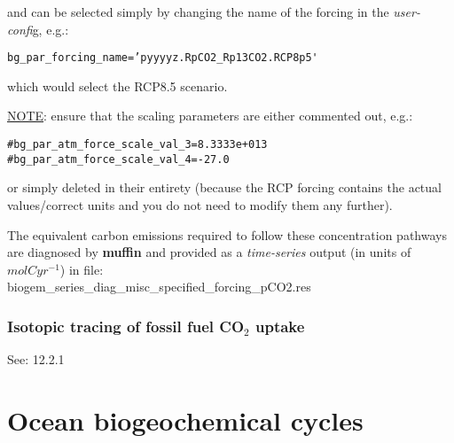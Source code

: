 \documentclass[11pt,fleqn]{book} %
\begin{document}
\noindent and can be selected simply by changing the name of the forcing in the \textit{user-confi}g, e.g.:
\vspace{-2pt}\begin{verbatim}
bg_par_forcing_name=’pyyyyz.RpCO2_Rp13CO2.RCP8p5'
\end{verbatim}\vspace{-2pt}
\noindent which would select the RCP8.5 scenario.

\vspace{1mm}
\noindent \uline{NOTE}: ensure that
the scaling parameters are either commented out, e.g.:
\vspace{-2pt}\small\begin{verbatim}
#bg_par_atm_force_scale_val_3=8.3333e+013
#bg_par_atm_force_scale_val_4=-27.0
\end{verbatim}\normalsize\vspace{-2pt}
\noindent or simply deleted in their entirety (because the RCP forcing contains the actual values/correct units and you do not need to modify them any further).

The equivalent carbon emissions required to follow these concentration pathways are diagnosed by \textbf{muffin} and provided as a \textit{time-series} output (in units of \(mol C yr^{-1}\)) in file: 
\vspace{1mm}
\\\textsf{\footnotesize biogem\_series\_diag\_misc\_specified\_forcing\_pCO2.res}


\subsection{Isotopic tracing of fossil fuel CO$_{2}$ uptake}

See: 12.2.1


\cleardoublepage


\chapter{Ocean biogeochemical cycles}\label{ch:ocean=biogeochem}
\end{document}

